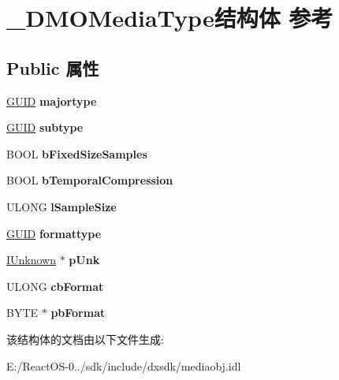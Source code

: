\hypertarget{struct___d_m_o_media_type}{}\section{\+\_\+\+D\+M\+O\+Media\+Type结构体 参考}
\label{struct___d_m_o_media_type}
\subsection*{Public 属性}
\begin{DoxyCompactItemize}
\item 
\mbox{\label{struct___d_m_o_media_type_a006bb7c3b6e3fa2677ad341c75a4c1ff}} 
\hyperlink{interface_g_u_i_d}{G\+U\+ID} {\bfseries majortype}
\item 
\mbox{\label{struct___d_m_o_media_type_a0016a8cffdc06d621958310719396a59}} 
\hyperlink{interface_g_u_i_d}{G\+U\+ID} {\bfseries subtype}
\item 
\mbox{\label{struct___d_m_o_media_type_a605b605702ee17d5a0f2e2af3c356b18}} 
B\+O\+OL {\bfseries b\+Fixed\+Size\+Samples}
\item 
\mbox{\label{struct___d_m_o_media_type_adc4e7238b553d32a763ad7e710000d1c}} 
B\+O\+OL {\bfseries b\+Temporal\+Compression}
\item 
\mbox{\label{struct___d_m_o_media_type_a242c549fe98850ef852756733c844187}} 
U\+L\+O\+NG {\bfseries l\+Sample\+Size}
\item 
\mbox{\label{struct___d_m_o_media_type_aec1a8afd6c00231b5f5bbfbe51eb7547}} 
\hyperlink{interface_g_u_i_d}{G\+U\+ID} {\bfseries formattype}
\item 
\mbox{\label{struct___d_m_o_media_type_a6b7c2f4acc1e440ddbdbce15f0c51c67}} 
\hyperlink{interface_i_unknown}{I\+Unknown} $\ast$ {\bfseries p\+Unk}
\item 
\mbox{\label{struct___d_m_o_media_type_a550fca2817a1a30eed3d5008df06e6ef}} 
U\+L\+O\+NG {\bfseries cb\+Format}
\item 
\mbox{\label{struct___d_m_o_media_type_ac043d3c194967ab556443057186121d0}} 
B\+Y\+TE $\ast$ {\bfseries pb\+Format}
\end{DoxyCompactItemize}


该结构体的文档由以下文件生成\+:\begin{DoxyCompactItemize}
\item 
E\+:/\+React\+O\+S-\/0../sdk/include/dxsdk/mediaobj.\+idl\end{DoxyCompactItemize}

